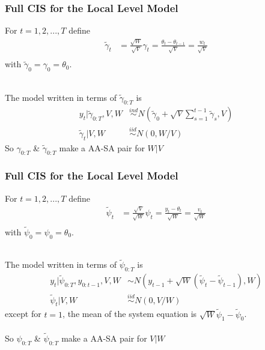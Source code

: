\documentclass[xcolor=dvipsnames]{beamer}\usepackage{graphicx, color}
\begin{document}
\begin{frame}
  \frametitle{Full CIS for the Local Level Model}
  For $t=1,2,...,T$ define
  \begin{align*}
    \tilde{\gamma}_t & = \frac{\sqrt{W}}{\sqrt{V}}\gamma_t = \frac{\theta_t - \theta_{t-1}}{\sqrt{V}} = \frac{w_t}{\sqrt{V}}\\
  \end{align*}
  with $\tilde{\gamma}_0=\gamma_0=\theta_0$.\\~\\
  \pause
  
  The model written in terms of $\tilde{\gamma}_{0:T}$ is
  \begin{align*}
  y_t|\tilde{\gamma}_{0:T}, V, W &\stackrel{ind}{\sim} N(\tilde{\gamma}_0 + \sqrt{V}\textstyle\sum_{s=1}^{t-1}\tilde{\gamma}_s, V)\\
  \tilde{\gamma}_t|V,W &\stackrel{iid}{\sim} N(0, W/V)
\end{align*}
So $\gamma_{0:T}$ \& $\tilde{\gamma}_{0:T}$ make a AA-SA pair for $W|V$
\end{frame}


\begin{frame}
  \frametitle{Full CIS for the Local Level Model}
  For $t=1,2,...,T$ define
  \begin{align*}
    \tilde{\psi}_t & = \frac{\sqrt{V}}{\sqrt{W}}\psi_t = \frac{y_t - \theta_{t}}{\sqrt{W}} = \frac{v_t}{\sqrt{W}}\\
  \end{align*}
  with $\tilde{\psi}_0=\psi_0=\theta_0$.\\~\\
  \pause
  
  The model written in terms of $\tilde{\psi}_{0:T}$ is
  \begin{align*}
  y_t|\tilde{\psi}_{0:T}, y_{0:t-1}, V, W & \sim N(y_{t-1} + \sqrt{W}(\tilde{\psi}_t - \tilde{\psi}_{t-1}), W)\\
  \tilde{\psi}_t|V,W &\stackrel{iid}{\sim}N(0,V/W)
\end{align*}
except for $t=1$, the mean of the system equation is $\sqrt{W}\tilde{\psi}_1 - \tilde{\psi}_0$.\\~\\

So $\psi_{0:T}$ \& $\tilde{\psi}_{0:T}$ make a AA-SA pair for $V|W$
\end{frame}
\end{document}
